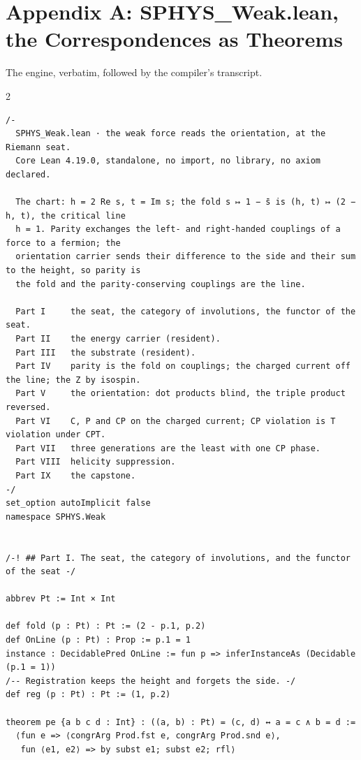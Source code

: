 \documentclass[10pt]{article}
\begin{document}
\hypertarget{appendix-a-sphys_weak.lean-the-correspondences-as-theorems}{%
\section{Appendix A: SPHYS\_Weak.lean, the Correspondences as
Theorems}\label{appendix-a-sphys_weak.lean-the-correspondences-as-theorems}}

The engine, verbatim, followed by the compiler's transcript.

\begin{multicols}{2}
\begin{Verbatim}[fontsize=\fontsize{6.2}{7.2}\selectfont,breaklines,breakanywhere,breaksymbolleft={}]
/-
  SPHYS_Weak.lean · the weak force reads the orientation, at the Riemann seat.
  Core Lean 4.19.0, standalone, no import, no library, no axiom declared.

  The chart: h = 2 Re s, t = Im s; the fold s ↦ 1 − s̄ is (h, t) ↦ (2 − h, t), the critical line
  h = 1. Parity exchanges the left- and right-handed couplings of a force to a fermion; the
  orientation carrier sends their difference to the side and their sum to the height, so parity is
  the fold and the parity-conserving couplings are the line.

  Part I     the seat, the category of involutions, the functor of the seat.
  Part II    the energy carrier (resident).
  Part III   the substrate (resident).
  Part IV    parity is the fold on couplings; the charged current off the line; the Z by isospin.
  Part V     the orientation: dot products blind, the triple product reversed.
  Part VI    C, P and CP on the charged current; CP violation is T violation under CPT.
  Part VII   three generations are the least with one CP phase.
  Part VIII  helicity suppression.
  Part IX    the capstone.
-/
set_option autoImplicit false
namespace SPHYS.Weak


/-! ## Part I. The seat, the category of involutions, and the functor of the seat -/

abbrev Pt := Int × Int

def fold (p : Pt) : Pt := (2 - p.1, p.2)
def OnLine (p : Pt) : Prop := p.1 = 1
instance : DecidablePred OnLine := fun p => inferInstanceAs (Decidable (p.1 = 1))
/-- Registration keeps the height and forgets the side. -/
def reg (p : Pt) : Pt := (1, p.2)

theorem pe {a b c d : Int} : ((a, b) : Pt) = (c, d) ↔ a = c ∧ b = d :=
  ⟨fun e => ⟨congrArg Prod.fst e, congrArg Prod.snd e⟩,
   fun ⟨e1, e2⟩ => by subst e1; subst e2; rfl⟩


\end{Verbatim}
\end{multicols}
\end{document}

